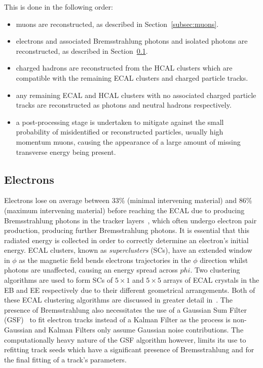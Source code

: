 This is done in the following order: 
\begin{itemize}
\item muons are reconstructed, as described in Section~\ref{subsec:muons}.
\item electrons and associated Bremsstrahlung photons and isolated photons are reconstructed, as described in Section~\ref{subsec:electrons}.
\item charged hadrons are reconstructed from the HCAL clusters which are compatible with the remaining ECAL clusters and charged particle tracks.
\item any remaining ECAL and HCAL clusters with no associated charged particle tracks are reconstructed as photons and neutral hadrons respectively.
\item a post-processing stage is undertaken to mitigate against the small probability of misidentified or reconstructed particles, usually high momentum muons, causing the appearance of a large amount of missing transverse energy being present.
\end{itemize}

\subsection{Electrons}\label{subsec:electrons}
Electrons lose on average between 33\% (minimal intervening material) and 86\% (maximum intervening material) before reaching the ECAL due to producing Bremsstrahlung photons in the tracker layers~\cite{Khachatryan:2015hwa}, which often undergo electron pair production, producing further Bremsstrahlung photons.	
It is essential that this radiated energy is collected in order to correctly determine an electron's initial energy.
ECAL clusters, known as \emph{superclusters} (SCs), have an extended window in $\phi$ as the magnetic field bends electrons trajectories in the $\phi$ direction whilst photons are unaffected, causing an energy spread across $phi$.
Two clustering algorithms are used to form SCs of $5 \times 1$ and $5 \times 5$ arrays of ECAL crystals in the EB and EE respectively due to their different geometrical arrangements.
Both of these ECAL clustering algorithms are discussed in greater detail in~\cite{Khachatryan:2015hwa}.
The presence of Bremsstrahlung also necessitates the use of a Gaussian Sum Filter (GSF)~\cite{Adam:2003eca} to fit electron tracks instead of a Kalman Filter as the process is non-Gaussian and Kalman Filters only assume Gaussian noise contributions.
The computationally heavy nature of the GSF algorithm however, limits its use to refitting \KF track seeds which have a significant presence of Bremsstrahlung and for the final fitting of a track's parameters.


